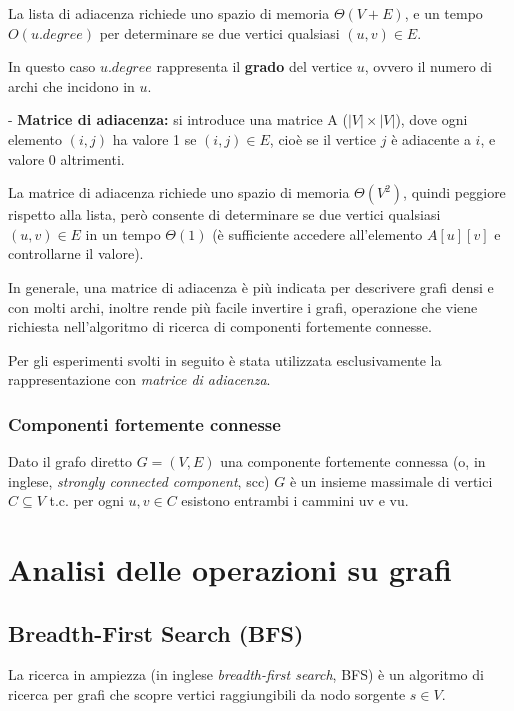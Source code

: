 \documentclass[a4paper,12pt]{article}
\begin{document}
La lista di adiacenza richiede uno spazio di memoria $\Theta(V + E)$, e un tempo $O(u.degree)$ per determinare se due vertici qualsiasi $(u, v) \in E$.

In questo caso $u.degree$ rappresenta il \textbf{grado} del vertice $u$, ovvero il numero di archi che incidono in $u$.
\newline

- \textbf{Matrice di adiacenza:}
si introduce una matrice A ($|V|\times|V|$), dove ogni elemento $(i, j)$ ha valore 1 se $(i, j) \in E$, cioè se il vertice $j$ è adiacente a $i$, e valore 0 altrimenti.

La matrice di adiacenza richiede uno spazio di memoria $\Theta(V^2)$, quindi peggiore rispetto alla lista, però consente di determinare se due vertici qualsiasi $(u, v) \in E$ in un tempo $\Theta(1)$ (è sufficiente accedere all'elemento $A[u][v]$ e controllarne il valore).

In generale, una matrice di adiacenza è più indicata per descrivere grafi densi e con molti archi, inoltre rende più facile invertire i grafi, operazione che viene richiesta nell'algoritmo di ricerca di componenti fortemente connesse.
\newline

Per gli esperimenti svolti in seguito è stata utilizzata esclusivamente la rappresentazione con \textit{matrice di adiacenza}.

\subsubsection{Componenti fortemente connesse}
Dato il grafo diretto $G = (V, E)$ una componente fortemente connessa (o, in inglese, \textit{strongly connected component}, scc) $G$ è un insieme massimale di vertici $C ⊆ V$ t.c. per ogni $u,v \in C$ esistono entrambi i cammini u\textrightarrow v e v\textrightarrow u.

\section{Analisi delle operazioni su grafi}
\subsection{Breadth-First Search (BFS)}
La ricerca in ampiezza (in inglese \textit{breadth-first search}, BFS) è un algoritmo di ricerca per grafi che scopre vertici raggiungibili da nodo sorgente $s \in V$.
\newline
\end{document}
